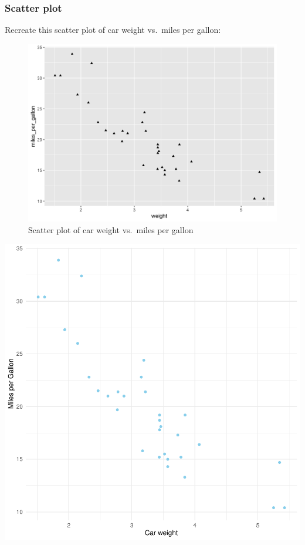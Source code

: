 \documentclass[
  man,
  floatsintext,
  longtable,
  nolmodern,
  notxfonts,
  notimes,
  colorlinks=true,linkcolor=blue,citecolor=blue,urlcolor=blue]{apa7}
\begin{document}
\subsubsection{Scatter plot}\label{scatter-plot}

Recreate this scatter plot of car weight vs.~miles per gallon:

\begin{figure}[H]

\caption{Scatter plot of car weight vs.~miles per gallon}

{\centering \includegraphics{plots/plot3.png}

}

\end{figure}%

\includegraphics{data-visualization_files/figure-pdf/Scatterplot-1.pdf}
\end{document}
